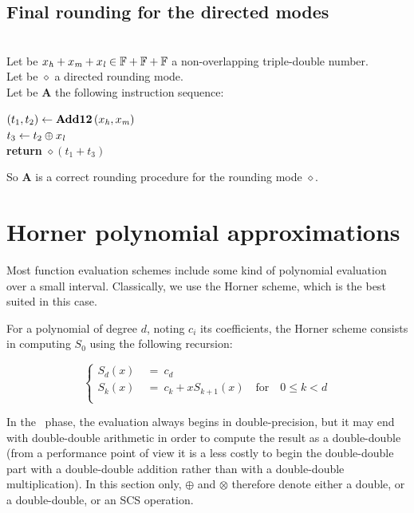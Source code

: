 \subsection{Final rounding for the directed modes}

\begin{theorem} \label{arrdir} ~ \\
Let be $x_{\mathit{h}} + x_{\mathit{m}} + x_{\mathit{l}} \in \mathbb {F} + \mathbb {F} + \mathbb {F}$ a non-overlapping triple-double number. \\
Let be $\diamond$ a directed rounding mode.\\
Let be {\bf A} the following instruction sequence:
\begin{center}
\begin{minipage}[b]{50mm}
$\left( t_1, t_2 \right) \gets \mathbf{Add12}\left( x_{\mathit{h}}, x_{\mathit{m}} \right)$ \\
$t_3 \gets t_2 \oplus x_{\mathit{l}}$ \\
{\bf return } $\diamond\left( t_1 + t_3 \right)$
\end{minipage}
\end{center}
So {\bf A} is a correct rounding procedure for the rounding mode $\diamond$.
\end{theorem}

\section{Horner polynomial approximations \label{sec:Horner}}

Most function evaluation schemes include some kind of polynomial
evaluation over a small interval. Classically, we use the Horner
scheme, which is the best suited in this case. 

For a polynomial of degree $d$, noting $c_i$ its coefficients, the
Horner scheme consists in computing $S_0$ using the following
recursion:

  $$ \left\{
    \begin{array}{rl}
      S_d(x)  &\ = \ c_d\\
      S_k(x)  &\  =\ c_k+xS_{k+1}(x) \quad \mathrm{for}\quad 0\le k <d\\
    \end{array}
  \right.
  $$


  
  In the \quick\ phase, the evaluation always begins in
  double-precision, but it may end with double-double arithmetic in
  order to compute the result as a double-double (from a performance
  point of view it is a less costly to begin the double-double part
  with a double-double addition rather than with a double-double
  multiplication).  In this section only, $\oplus$ and $\otimes$
  therefore denote either a double, or a double-double, or an SCS
  operation.


